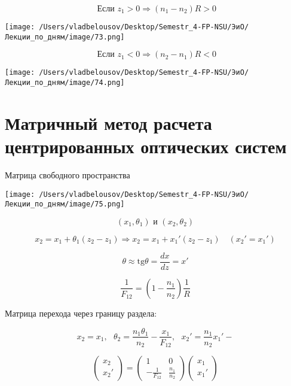 \documentclass[12pt, a4paper]{report}
\begin{document}
\[ \text{ Если } z_1>0 \Rightarrow (n_1 - n_2 )R >0 \] 

\begin{center}
    \texttt{[image: /Users/vladbelousov/Desktop/Semestr\_4-FP-NSU/ЭиО/Лекции\_по\_дням/image/73.png]}
\end{center} 

\[ \text{ Если } z_1< 0 \Rightarrow (n_2 -n_1 )R < 0   \] 

\begin{center}
    \texttt{[image: /Users/vladbelousov/Desktop/Semestr\_4-FP-NSU/ЭиО/Лекции\_по\_дням/image/74.png]}
\end{center} 

\section{Матричный метод расчета центрированных оптических систем}

Матрица свободного пространства 

\begin{center}
    \texttt{[image: /Users/vladbelousov/Desktop/Semestr\_4-FP-NSU/ЭиО/Лекции\_по\_дням/image/75.png]}
\end{center} 

\[ (x_1 , \theta_1 ) \text{ и  } (x_2 , \theta_2 )  \] 

\[ x_2 = x_1 + \theta_1 (z_2 -z_1 ) \Rightarrow x_2 = x_1 + x_1 ' (z_2 -z_1  ) \quad  (x_2 ' = x_1 ') \] 

\[ \theta \approx \mathrm{tg}   \theta = \frac{dx}{dz } = x ' \] 

\[ \frac{1}{F_{12} } = \left(  1 - \frac{n_1}{n_2 }  \right) \frac{1}{R}   \] 

Матрица перехода через границу раздела: 

\[ x_2 = x_1  , \text{ } \theta_2 = \frac{n_1 \theta_1 }{n_2 } - \frac{x_1}{F_{12} }  , \text{ } x_2 ' = \frac{n_1}{n_2 }x_1 ' -   \] 

\[ \begin{pmatrix}
x_2     \\
x_2 '
\end{pmatrix} = \begin{pmatrix}
1  & 0 \\
-\frac{1}{F_{12} }  & \frac{n_1}{n_2} 
\end{pmatrix} \begin{pmatrix}
x_1     \\
x_1' 
\end{pmatrix} \] 
\end{document}
